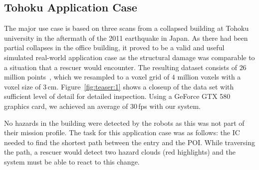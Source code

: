 \documentclass{egpubl}
\begin{document}
\subsection{Tohoku Application Case} \label{sec:results:applicationcase}

The major use case is based on three scans from a collapsed building at Tohoku university in the aftermath of the 2011 earthquake in Japan. As there had been partial collapses in the office building, it proved to be a valid and useful simulated real-world application case as the structural damage was comparable to a situation that a rescuer would encounter. The resulting dataset consists of $26$ million points~\cite{journals/jfr/NagataniKOOYTNYKFK13}, which we resampled to a voxel grid of $4$ million voxels with a voxel size of 3\,cm. Figure~\ref{fig:teaser:1} shows a closeup of the data set with sufficient level of detail for detailed inspection. Using a GeForce GTX 580 graphics card, we achieved an average of 30\,fps with our system.

No hazards in the building were detected by the robots as this was not part of their mission profile. The task for this application case was as follows: the IC needed to find the shortest path between the entry and the POI. While traversing the path, a rescuer would detect two hazard clouds (red highlights) and the system must be able to react to this change.
\end{document}

